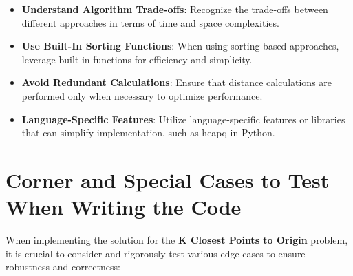 \begin{itemize}
    \item \textbf{Understand Algorithm Trade-offs}: Recognize the trade-offs between different approaches in terms of time and space complexities.
    
    \item \textbf{Use Built-In Sorting Functions}: When using sorting-based approaches, leverage built-in functions for efficiency and simplicity.
    
    \item \textbf{Avoid Redundant Calculations}: Ensure that distance calculations are performed only when necessary to optimize performance.
    
    \item \textbf{Language-Specific Features}: Utilize language-specific features or libraries that can simplify implementation, such as heapq in Python.
\end{itemize}

\section*{Corner and Special Cases to Test When Writing the Code}

When implementing the solution for the \textbf{K Closest Points to Origin} problem, it is crucial to consider and rigorously test various edge cases to ensure robustness and correctness:

